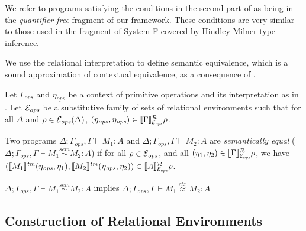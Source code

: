 We refer to programs satisfying the conditions in the second part of
 as being in the \emph{quantifier-free}
fragment of our framework. These conditions are very similar to those
used in the fragment of System F covered by Hindley-Milner type
inference.

We use the relational interpretation to define semantic equivalence,
which is a sound approximation of contextual equivalence, as a
consequence of .
\begin{definition}
  Let $\Gamma_{\mathit{ops}}$ and $\eta_{\mathit{ops}}$ be a context
  of primitive operations and its interpretation as in
  . Let $\mathcal{E}_{\mathit{ops}}$ be a
  substitutive family of sets of relational environments such that for
  all $\Delta$ and $\rho \in \mathcal{E}_{\mathit{ops}}(\Delta)$,
  $(\eta_{\mathit{ops}}, \eta_{\mathit{ops}}) \in
  \llbracket \Gamma \rrbracket^{\mathcal{R}}_{\mathcal{E}_{\mathit{ops}}}{\rho}$.

  Two programs $\Delta; \Gamma_{\mathit{ops}}, \Gamma \vdash M_1 : A$
  and $\Delta; \Gamma_{\mathit{ops}}, \Gamma \vdash M_2 : A$ are
  \emph{semantically equal} ($\Delta; \Gamma_{\mathit{ops}}, \Gamma
  \vdash M_1 \stackrel{sem}\sim M_2 : A$) if for all $\rho \in
  \mathcal{E}_{\mathit{ops}}$, and all $(\eta_1,\eta_2) \in
  \llbracket \Gamma \rrbracket^{\mathcal{R}}_{\mathcal{E}_{\mathit{ops}}}{\rho}$, we have
  $(\llbracket M_1 \rrbracket^{\mathit{tm}}(\eta_{\mathit{ops}},
  \eta_1),\llbracket M_2 \rrbracket^{\mathit{tm}}(\eta_{\mathit{ops}}, \eta_2)) \in
  \llbracket A \rrbracket^{\mathcal{R}}_{\mathcal{E}_{\mathit{ops}}}{\rho}$.
\end{definition}

\begin{theorem}\label{thm:soundness}
  $\Delta; \Gamma_{\mathit{ops}}, \Gamma \vdash M_1 \stackrel{sem}\sim M_2 : A$ implies
  $\Delta; \Gamma_{\mathit{ops}}, \Gamma \vdash M_1 \stackrel{ctx}\approx M_2 : A$
\end{theorem}

\subsection{Construction of Relational Environments}
\label{sec:constr-rel-env}

\newcommand{\Gen}{\mathrm{Gen}}
\newcommand{\Free}{\mathrm{Free}}
\newcommand{\semSort}[1]{\llbracket #1 \rrbracket^{\mathcal{S}}}
\newcommand{\semIndexExp}[1]{\llbracket #1 \rrbracket^{\mathcal{I}}}

